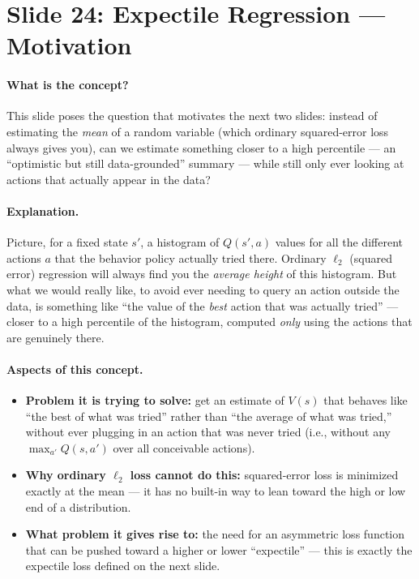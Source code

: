 \documentclass[11pt]{article}
\begin{document}
\section{Slide 24: Expectile Regression --- Motivation}

\paragraph{What is the concept?}
This slide poses the question that motivates the next two slides: instead of estimating
the \emph{mean} of a random variable (which ordinary squared-error loss always gives
you), can we estimate something closer to a high percentile --- an ``optimistic but
still data-grounded'' summary --- while still only ever looking at actions that actually
appear in the data?

\paragraph{Explanation.}
Picture, for a fixed state $s'$, a histogram of $Q(s',a)$ values for all the different
actions $a$ that the behavior policy actually tried there. Ordinary $\ell_2$ (squared
error) regression will always find you the \emph{average height} of this histogram. But
what we would really like, to avoid ever needing to query an action outside the data, is
something like ``the value of the \emph{best} action that was actually tried'' ---
closer to a high percentile of the histogram, computed \emph{only} using the actions
that are genuinely there.

\paragraph{Aspects of this concept.}
\begin{itemize}
\item \textbf{Problem it is trying to solve:} get an estimate of $V(s)$ that behaves
like ``the best of what was tried'' rather than ``the average of what was tried,''
without ever plugging in an action that was never tried (i.e., without any
$\max_{a'}Q(s,a')$ over all conceivable actions).
\item \textbf{Why ordinary $\ell_2$ loss cannot do this:} squared-error loss is
minimized exactly at the mean --- it has no built-in way to lean toward the high or low
end of a distribution.
\item \textbf{What problem it gives rise to:} the need for an asymmetric loss function
that can be pushed toward a higher or lower ``expectile'' --- this is exactly the
expectile loss defined on the next slide.
\end{itemize}
\end{document}
